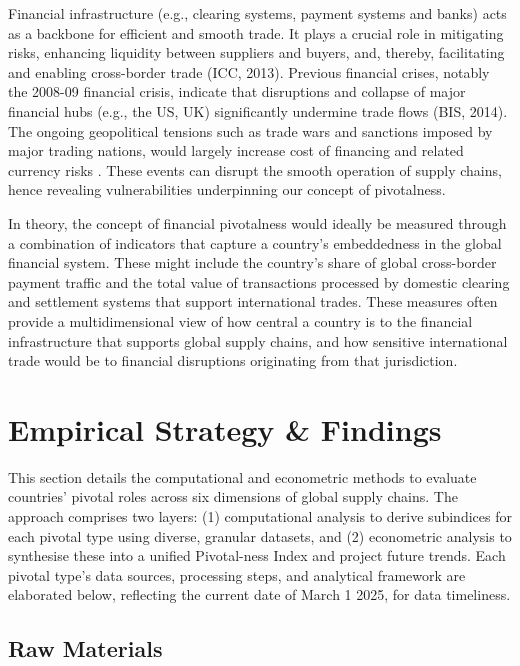 \documentclass[11pt]{article}
\begin{document}
Financial infrastructure (e.g., clearing systems, payment systems and banks) acts as a backbone for efficient and smooth trade. It plays a crucial role in mitigating risks, enhancing liquidity between suppliers and buyers, and, thereby, facilitating and enabling cross-border trade (ICC, 2013). Previous financial crises, notably the 2008-09 financial crisis, indicate that disruptions and collapse of major financial hubs (e.g., the US, UK) significantly undermine trade flows (BIS, 2014). The ongoing geopolitical tensions such as trade wars and sanctions imposed by major trading nations, would largely increase cost of financing and related currency risks \citep{bednarski2023}. These events can disrupt the smooth operation of supply chains, hence revealing vulnerabilities underpinning our concept of pivotalness.

In theory, the concept of financial pivotalness would ideally be measured through a combination of indicators that capture a country's embeddedness in the global financial system. These might include the country's share of global cross-border payment traffic and the total value of transactions processed by domestic clearing and settlement systems that support international trades. These measures often provide a multidimensional view of how central a country is to the financial infrastructure that supports global supply chains, and how sensitive international trade would be to financial disruptions originating from that jurisdiction.


\section{Empirical Strategy \& Findings}
\label{sec:empirics}

This section details the computational and econometric methods to evaluate countries’ pivotal roles across six dimensions of global supply chains. The approach comprises two layers: (1) computational analysis to derive subindices for each pivotal type using diverse, granular datasets, and (2) econometric analysis to synthesise these into a unified Pivotal-ness Index and project future trends. Each pivotal type’s data sources, processing steps, and analytical framework are elaborated below, reflecting the current date of March 1 2025, for data timeliness.

\subsection{Raw Materials}
\end{document}
